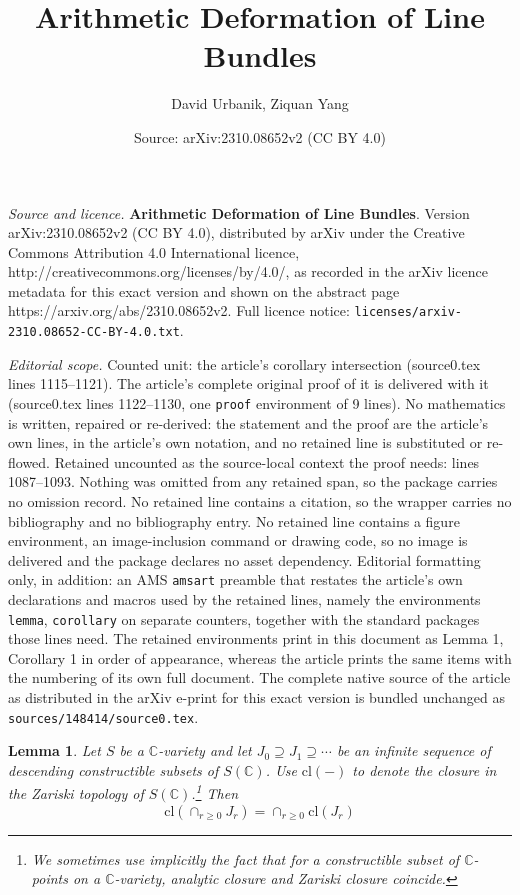 \documentclass[10pt,a4paper]{amsart}
\title{\textbf{\large{Arithmetic Deformation of Line Bundles}}}
\author{David Urbanik, Ziquan Yang}
\date{Source: arXiv:2310.08652v2 (CC BY 4.0)}
\newtheorem{lemma}{Lemma}
\newcommand{\IC}{\mathbb{C}}
\newcommand{\cl}{\mathrm{cl}}
\begin{document}
\maketitle

\noindent\emph{Source and licence.} \textbf{\large{Arithmetic Deformation of Line Bundles}}. Version arXiv:2310.08652v2 (CC BY 4.0), distributed by arXiv under the Creative Commons Attribution 4.0 International licence, http://creativecommons.org/licenses/by/4.0/, as recorded in the arXiv licence metadata for this exact version and shown on the abstract page https://arxiv.org/abs/2310.08652v2. Full licence notice: \texttt{licenses/arxiv-2310.08652-CC-BY-4.0.txt}.\par\smallskip

\noindent\textit{Editorial scope.} Counted unit: the article's corollary intersection (source0.tex lines 1115--1121). The article's complete original proof of it is delivered with it (source0.tex lines 1122--1130, one \texttt{proof} environment of 9 lines). No mathematics is written, repaired or re-derived: the statement and the proof are the article's own lines, in the article's own notation, and no retained line is substituted or re-flowed.  Retained uncounted as the source-local context the proof needs: lines 1087--1093.  Nothing was omitted from any retained span, so the package carries no omission record.  No retained line contains a citation, so the wrapper carries no bibliography and no bibliography entry.  No retained line contains a figure environment, an image-inclusion command or drawing code, so no image is delivered and the package declares no asset dependency.  Editorial formatting only, in addition: an AMS \texttt{amsart} preamble that restates the article's own declarations and macros used by the retained lines, namely the environments \texttt{lemma}, \texttt{corollary} on separate counters, together with the standard packages those lines need.  The retained environments print in this document as Lemma 1, Corollary 1 in order of appearance, whereas the article prints the same items with the numbering of its own full document.  The complete native source of the article as distributed in the arXiv e-print for this exact version is bundled unchanged as \texttt{sources/148414/source0.tex}.
\begin{lemma}
\label{lem: infinite intersection}
Let $S$ be a $\IC$-variety and let $J_0 \supseteq J_1 \supseteq \cdots$ be an infinite sequence of descending constructible subsets of $S(\IC)$. Use $\cl(-)$ to denote the closure in the Zariski topology of $S(\IC)$.\footnote{We sometimes use implicitly the fact that for a constructible subset of $\IC$-points on a $\IC$-variety, analytic closure and Zariski closure coincide.} Then 
\begin{equation}
    \cl(\cap_{r \ge 0} J_r) = \cap_{r \ge 0} \cl(J_r)
\end{equation}
\end{lemma}
\end{document}
